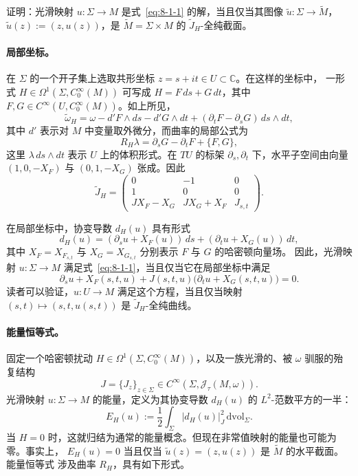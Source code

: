 \begin{exercise}\label{ex:8-1-5}
证明：光滑映射 $u:\Sigma\to M$ 是式~\eqref{eq:8-1-1} 的解，当且仅当其图像
$\widetilde u:\Sigma\to\widetilde M$，$\widetilde u(z):=(z,u(z))$，是
$\widetilde M=\Sigma\times M$ 的 $\widetilde J_H$-全纯截面。
\end{exercise}

\paragraph{局部坐标。}
在 $\Sigma$ 的一个开子集上选取共形坐标 $z=s+it\in U\subset\mathbb C$。在这样的坐标中，
一形式 $H\in\Omega^1(\Sigma,C_0^\infty(M))$ 可写成
$H=F\,ds+G\,dt$，其中 $F,G\in C^\infty(U,C_0^\infty(M))$。如上所见，
\[
  \widetilde\omega_H
  =\omega-d'F\wedge ds-d'G\wedge dt
   +(\partial_tF-\partial_sG)\,ds\wedge dt,
\]
其中 $d'$ 表示对 $M$ 中变量取外微分，而曲率的局部公式为
\[
  R_H\lambda=\partial_sG-\partial_tF+\{F,G\},
\]
这里 $\lambda\,ds\wedge dt$ 表示 $U$ 上的体积形式。在 $TU$ 的标架
$\partial_s,\partial_t$ 下，水平子空间由向量 $(1,0,-X_F)$ 与 $(0,1,-X_G)$ 张成。因此
\begin{equation}\label{eq:8-1-6}
  \widetilde J_H=
  \begin{pmatrix}
    0&-1&0\\
    1&0&0\\
    JX_F-X_G&JX_G+X_F&J_{s,t}
  \end{pmatrix}.
\end{equation}

在局部坐标中，协变导数 $d_H(u)$ 具有形式
\[
  d_H(u)=(\partial_su+X_F(u))\,ds+(\partial_tu+X_G(u))\,dt,
\]
其中 $X_F=X_{F_{s,t}}$ 与 $X_G=X_{G_{s,t}}$ 分别表示 $F$ 与 $G$ 的哈密顿向量场。
因此，光滑映射 $u:\Sigma\to M$ 满足式~\eqref{eq:8-1-1}，当且仅当它在局部坐标中满足
\begin{equation}\label{eq:8-1-7}
  \partial_su+X_F(s,t,u)
  +J(s,t,u)\bigl(\partial_tu+X_G(s,t,u)\bigr)=0.
\end{equation}
读者可以验证，$u:U\to M$ 满足这个方程，当且仅当映射
$(s,t)\mapsto(s,t,u(s,t))$ 是 $\widetilde J_H$-全纯曲线。

\paragraph{能量恒等式。}
固定一个哈密顿扰动 $H\in\Omega^1(\Sigma,C_0^\infty(M))$，以及一族光滑的、被
$\omega$ 驯服的殆复结构
\[
  J=\{J_z\}_{z\in\Sigma}
  \in C^\infty(\Sigma,\mathcal J_\tau(M,\omega)).
\]
光滑映射 $u:\Sigma\to M$ 的能量，定义为其协变导数 $d_H(u)$ 的 $L^2$-范数平方的一半：
\begin{equation}\label{eq:8-1-8}
  E_H(u):=\frac12\int_\Sigma\lvert d_H(u)\rvert_J^2\,
  \mathrm{dvol}_\Sigma.
\end{equation}
当 $H=0$ 时，这就归结为通常的能量概念。但现在非常值映射的能量也可能为零。事实上，
$E_H(u)=0$ 当且仅当 $\widetilde u(z)=(z,u(z))$ 是 $\widetilde M$ 的水平截面。能量恒等式
涉及曲率 $R_H$，具有如下形式。

